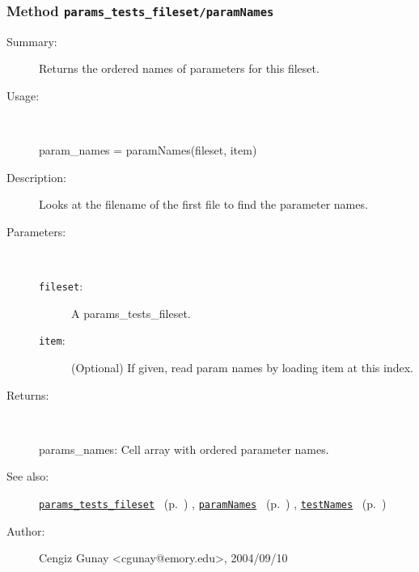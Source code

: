 \subsubsection[Method \texttt{paramNames}]{Method \texttt{params\_tests\_fileset/paramNames}}%
%
\label{ref_params_tests_fileset__paramNames}%
\hypertarget{ref_params_tests_fileset__paramNames}{}%
\begin{description}
\item[Summary:]Returns the ordered names of parameters for this fileset.
%
\item[Usage:]~%
\begin{lyxcode}%
param\_names = paramNames(fileset, item)
%
\end{lyxcode}%
%
\item[Description:]%
Looks at the filename of the first file to find the parameter names.
\item[Parameters:]~
\begin{description}%
\item[\texttt{fileset}:]
 A params\_tests\_fileset.
\item[\texttt{item}:]
 (Optional) If given, read param names by loading item at this index.
\end{description}%
%
\item[Returns:]~

	params\_names: Cell array with ordered parameter names.
%
%
\item[See also:]%
\hyperlink{ref_params_tests_fileset}{\texttt{params\_tests\_fileset}}%
\ (p.~\pageref{ref_params_tests_fileset})%
%
, \hyperlink{ref_paramNames}{\texttt{paramNames}}%
\ (p.~\pageref{ref_paramNames})%
%
, \hyperlink{ref_testNames}{\texttt{testNames}}%
\ (p.~\pageref{ref_testNames})%
%
%
\item[Author:]%
Cengiz Gunay <cgunay@emory.edu>, 2004/09/10%
\end{description}
\methodline%
